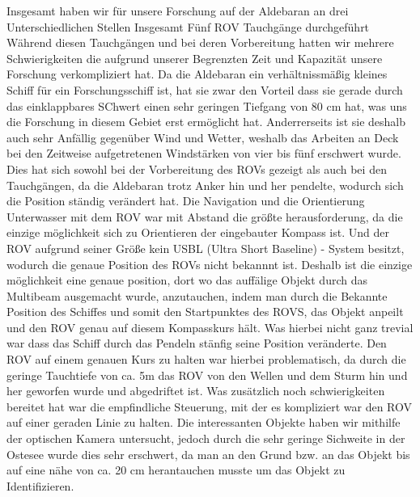 Insgesamt haben wir für unsere Forschung auf der Aldebaran an drei Unterschiedlichen Stellen Insgesamt Fünf ROV Tauchgänge durchgeführt 
Während diesen Tauchgängen und bei deren Vorbereitung hatten wir mehrere Schwierigkeiten die aufgrund unserer Begrenzten Zeit und Kapazität unsere Forschung verkompliziert hat.
Da die Aldebaran ein verhältnissmäßig kleines Schiff für ein Forschungsschiff ist, hat sie zwar den Vorteil dass sie gerade durch das einklappbares SChwert einen sehr geringen Tiefgang von 80 cm hat, was uns die Forschung in diesem Gebiet erst ermöglicht hat.
Anderrerseits ist sie deshalb auch sehr Anfällig gegenüber Wind und Wetter, weshalb das Arbeiten an Deck bei den Zeitweise aufgetretenen Windstärken von vier bis fünf erschwert wurde.
Dies hat sich sowohl bei der Vorbereitung des ROVs gezeigt als auch bei den Tauchgängen, da die Aldebaran trotz Anker hin und her pendelte, wodurch sich die Position ständig verändert hat.
Die Navigation und die Orientierung Unterwasser mit dem ROV war mit Abstand die größte herausforderung, da die einzige möglichkeit sich zu Orientieren der eingebauter Kompass ist.
Und der ROV aufgrund seiner Größe kein USBL (Ultra Short Baseline) - System besitzt, wodurch die genaue Position des ROVs nicht bekannnt ist.
Deshalb ist die einzige möglichkeit eine genaue position, dort wo das auffälige Objekt durch das Multibeam ausgemacht wurde, anzutauchen, indem man durch die Bekannte Position des Schiffes und somit den Startpunktes des ROVS, das Objekt anpeilt und den ROV genau auf diesem Kompasskurs hält.
Was hierbei nicht ganz trevial war dass das Schiff durch das Pendeln stänfig seine Position veränderte.
Den ROV auf einem genauen Kurs zu halten war hierbei problematisch, da durch die geringe Tauchtiefe von ca. 5m das ROV von den Wellen und dem Sturm hin und her geworfen wurde und abgedriftet ist.
Was zusätzlich noch schwierigkeiten bereitet hat war die empfindliche Steuerung, mit der es kompliziert war den ROV auf einer geraden Linie zu halten.
Die interessanten Objekte haben wir mithilfe der optischen Kamera untersucht, jedoch durch die sehr geringe Sichweite in der Ostesee wurde dies sehr erschwert, da man an den Grund bzw. an das Objekt bis auf eine nähe von ca. 20 cm herantauchen musste um das Objekt zu Identifizieren. 